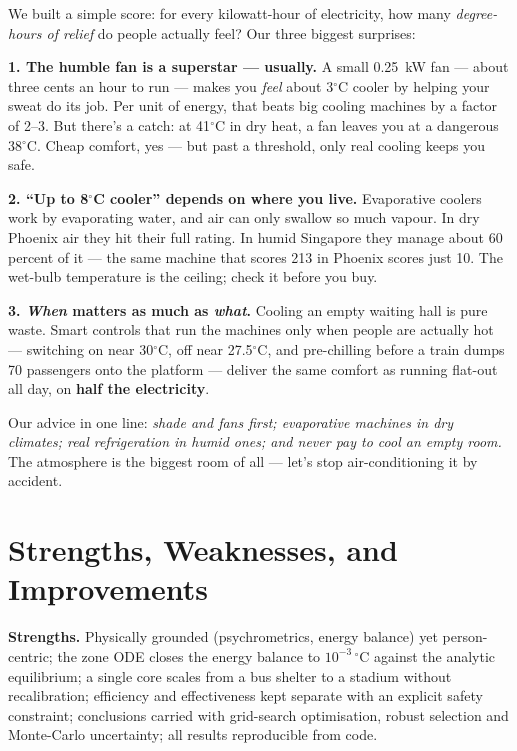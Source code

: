 \documentclass[11pt]{article}
\newcommand{\degrees}{\ensuremath{^\circ}}
\begin{document}
We built a simple score: for every kilowatt-hour of electricity, how many \emph{degree-hours of relief} do people actually feel? Our three biggest surprises:

\textbf{1. The humble fan is a superstar --- usually.} A small 0.25~kW fan --- about three cents an hour to run --- makes you \emph{feel} about 3$\degrees$C cooler by helping your sweat do its job. Per unit of energy, that beats big cooling machines by a factor of 2--3. But there's a catch: at 41$\degrees$C in dry heat, a fan leaves you at a dangerous 38$\degrees$C. Cheap comfort, yes --- but past a threshold, only real cooling keeps you safe.

\textbf{2. ``Up to 8$\degrees$C cooler'' depends on where you live.} Evaporative coolers work by evaporating water, and air can only swallow so much vapour. In dry Phoenix air they hit their full rating. In humid Singapore they manage about 60 percent of it --- the same machine that scores 213 in Phoenix scores just 10. The wet-bulb temperature is the ceiling; check it before you buy.

\textbf{3. \emph{When} matters as much as \emph{what}.} Cooling an empty waiting hall is pure waste. Smart controls that run the machines only when people are actually hot --- switching on near 30$\degrees$C, off near 27.5$\degrees$C, and pre-chilling before a train dumps 70 passengers onto the platform --- deliver the same comfort as running flat-out all day, on \textbf{half the electricity}.

Our advice in one line: \emph{shade and fans first; evaporative machines in dry climates; real refrigeration in humid ones; and never pay to cool an empty room.} The atmosphere is the biggest room of all --- let's stop air-conditioning it by accident.

\section{Strengths, Weaknesses, and Improvements}
\textbf{Strengths.} Physically grounded (psychrometrics, energy balance) yet person-centric; the zone ODE closes the energy balance to $10^{-3}\,\degrees$C against the analytic equilibrium; a single core scales from a bus shelter to a stadium without recalibration; efficiency and effectiveness kept separate with an explicit safety constraint; conclusions carried with grid-search optimisation, robust selection and Monte-Carlo uncertainty; all results reproducible from code.
\end{document}
